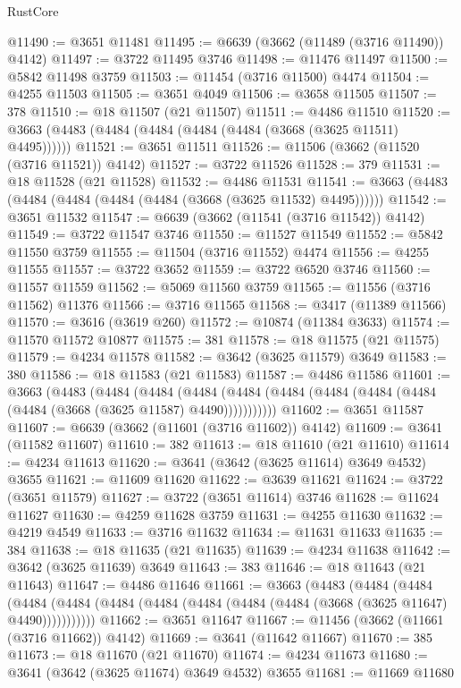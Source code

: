 \begin{lexlean}{RustCore}
\begin{coremodule}
@11490 := @3651 @11481
@11495 := @6639 (@3662 (@11489 (@3716 @11490)) @4142)
@11497 := @3722 @11495 @3746
@11498 := @11476 @11497
@11500 := @5842 @11498 @3759
@11503 := @11454 (@3716 @11500) @4474
@11504 := @4255 @11503
@11505 := @3651 @4049
@11506 := @3658 @11505
@11507 := 378
@11510 := @18 @11507 (@21 @11507)
@11511 := @4486 @11510
@11520 := @3663 (@4483 (@4484 (@4484 (@4484 (@4484 (@3668 (@3625 @11511) @4495))))))
@11521 := @3651 @11511
@11526 := @11506 (@3662 (@11520 (@3716 @11521)) @4142)
@11527 := @3722 @11526
@11528 := 379
@11531 := @18 @11528 (@21 @11528)
@11532 := @4486 @11531
@11541 := @3663 (@4483 (@4484 (@4484 (@4484 (@4484 (@3668 (@3625 @11532) @4495))))))
@11542 := @3651 @11532
@11547 := @6639 (@3662 (@11541 (@3716 @11542)) @4142)
@11549 := @3722 @11547 @3746
@11550 := @11527 @11549
@11552 := @5842 @11550 @3759
@11555 := @11504 (@3716 @11552) @4474
@11556 := @4255 @11555
@11557 := @3722 @3652
@11559 := @3722 @6520 @3746
@11560 := @11557 @11559
@11562 := @5069 @11560 @3759
@11565 := @11556 (@3716 @11562) @11376
@11566 := @3716 @11565
@11568 := @3417 (@11389 @11566)
@11570 := @3616 (@3619 @260)
@11572 := @10874 (@11384 @3633)
@11574 := @11570 @11572 @10877
@11575 := 381
@11578 := @18 @11575 (@21 @11575)
@11579 := @4234 @11578
@11582 := @3642 (@3625 @11579) @3649
@11583 := 380
@11586 := @18 @11583 (@21 @11583)
@11587 := @4486 @11586
@11601 := @3663
    (@4483
      (@4484
        (@4484
          (@4484 (@4484 (@4484 (@4484 (@4484 (@4484 (@4484 (@3668 (@3625 @11587) @4490)))))))))))
@11602 := @3651 @11587
@11607 := @6639 (@3662 (@11601 (@3716 @11602)) @4142)
@11609 := @3641 (@11582 @11607)
@11610 := 382
@11613 := @18 @11610 (@21 @11610)
@11614 := @4234 @11613
@11620 := @3641 (@3642 (@3625 @11614) @3649 @4532) @3655
@11621 := @11609 @11620
@11622 := @3639 @11621
@11624 := @3722 (@3651 @11579)
@11627 := @3722 (@3651 @11614) @3746
@11628 := @11624 @11627
@11630 := @4259 @11628 @3759
@11631 := @4255 @11630
@11632 := @4219 @4549
@11633 := @3716 @11632
@11634 := @11631 @11633
@11635 := 384
@11638 := @18 @11635 (@21 @11635)
@11639 := @4234 @11638
@11642 := @3642 (@3625 @11639) @3649
@11643 := 383
@11646 := @18 @11643 (@21 @11643)
@11647 := @4486 @11646
@11661 := @3663
    (@4483
      (@4484
        (@4484
          (@4484 (@4484 (@4484 (@4484 (@4484 (@4484 (@4484 (@3668 (@3625 @11647) @4490)))))))))))
@11662 := @3651 @11647
@11667 := @11456 (@3662 (@11661 (@3716 @11662)) @4142)
@11669 := @3641 (@11642 @11667)
@11670 := 385
@11673 := @18 @11670 (@21 @11670)
@11674 := @4234 @11673
@11680 := @3641 (@3642 (@3625 @11674) @3649 @4532) @3655
@11681 := @11669 @11680

\end{coremodule}
\end{lexlean}
